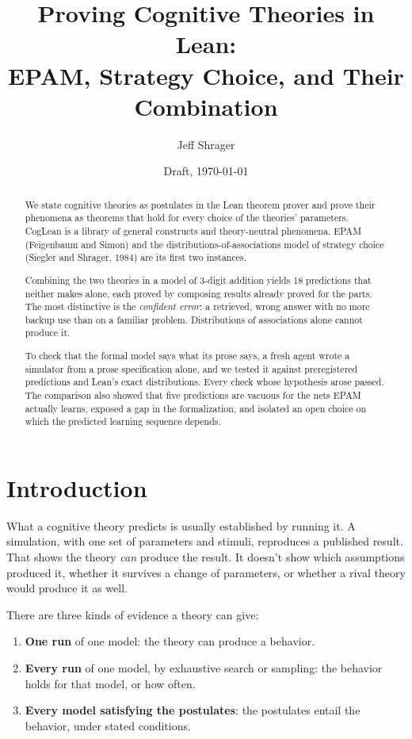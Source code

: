 \documentclass[11pt]{article}
\title{Proving Cognitive Theories in Lean:\\EPAM, Strategy Choice, and Their Combination}
\author{Jeff Shrager}
\date{Draft, \today}
\begin{document}
\maketitle

\begin{abstract}
We state cognitive theories as postulates in the Lean theorem prover and prove their phenomena as theorems that hold for every choice of the theories' parameters. CogLean is a library of general constructs and theory-neutral phenomena. EPAM (Feigenbaum and Simon) and the distributions-of-associations model of strategy choice (Siegler and Shrager, 1984) are its first two instances.

Combining the two theories in a model of 3-digit addition yields 18 predictions that neither makes alone, each proved by composing results already proved for the parts. The most distinctive is the \emph{confident error}: a retrieved, wrong answer with no more backup use than on a familiar problem. Distributions of associations alone cannot produce it.

To check that the formal model says what its prose says, a fresh agent wrote a simulator from a prose specification alone, and we tested it against preregistered predictions and Lean's exact distributions. Every check whose hypothesis arose passed. The comparison also showed that five predictions are vacuous for the nets EPAM actually learns, exposed a gap in the formalization, and isolated an open choice on which the predicted learning sequence depends.
\end{abstract}

\section{Introduction}

What a cognitive theory predicts is usually established by running it. A simulation, with one set of parameters and stimuli, reproduces a published result. That shows the theory \emph{can} produce the result. It doesn't show which assumptions produced it, whether it survives a change of parameters, or whether a rival theory would produce it as well.

There are three kinds of evidence a theory can give:
\begin{enumerate}
  \item \textbf{One run} of one model: the theory can produce a behavior.
  \item \textbf{Every run} of one model, by exhaustive search or sampling: the behavior holds for that model, or how often.
  \item \textbf{Every model satisfying the postulates}: the postulates entail the behavior, under stated conditions.
\end{enumerate}
\end{document}
